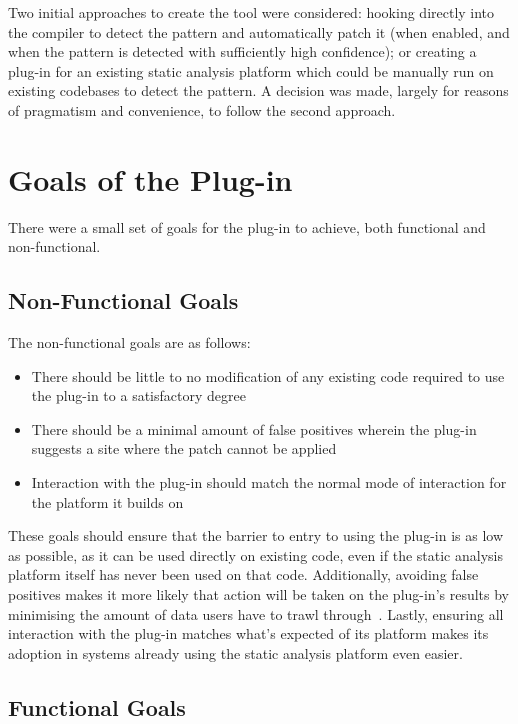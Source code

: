 Two initial approaches to create the tool were considered: hooking directly into the compiler to detect the pattern and automatically patch it (when enabled, and when the pattern is detected with sufficiently high confidence); or creating a plug-in for an existing static analysis platform which could be manually run on existing codebases to detect the pattern. A decision was made, largely for reasons of pragmatism and convenience, to follow the second approach.


\section{Goals of the Plug-in}

There were a small set of goals for the plug-in to achieve, both functional and non-functional.

\subsection{Non-Functional Goals}

The non-functional goals are as follows:

\begin{itemize}
	\item There should be little to no modification of any existing code required to use the plug-in to a satisfactory degree
	\item There should be a minimal amount of false positives wherein the plug-in suggests a site where the patch cannot be applied
	\item Interaction with the plug-in should match the normal mode of interaction for the platform it builds on
\end{itemize}

These goals should ensure that the barrier to entry to using the plug-in is as low as possible, as it can be used directly on existing code, even if the static analysis platform itself has never been used on that code. Additionally, avoiding false positives makes it more likely that action will be taken on the plug-in's results by minimising the amount of data users have to trawl through~\cite{infervideo}. Lastly, ensuring all interaction with the plug-in matches what's expected of its platform makes its adoption in systems already using the static analysis platform even easier.

\subsection{Functional Goals}

